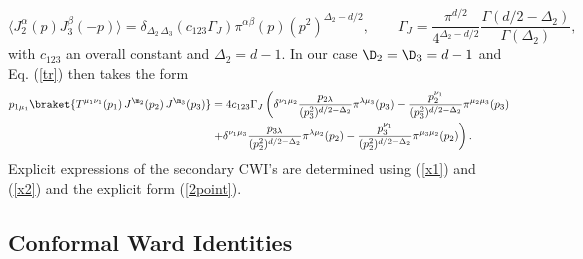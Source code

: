 \documentclass[a4paper,11pt,openright,twoside]{book}
\numberwithin{equation}{section}
\begin{document}
{{{\begin{equation}
	\langle J_2^\alpha(p)J_3^\beta(-p) \rangle =\delta_{\Delta_2\, \Delta_3}\left(c_{123} \Gamma_J \right)\pi^{\alpha\beta}(p) (p^2)^{\Delta_2-d/2},
	\qquad \Gamma_J=\frac{\pi^{d/2}}{ 4^{\Delta_2 -d/2}}\frac{\Gamma(d/2-\Delta_2)}{\Gamma(\Delta_2)},\label{twoJJ}
\end{equation}
with $c_{123}$ an overall constant and $\Delta_2=d-1$. In our case $\D_2=\D_3=d-1$ and Eq. (\ref{tr}) then takes the form 
\begin{align}
	\label{2point}
	p_{1\mu_1}\braket{T^{\mu_1\nu_1}(p_1)\,J^{\m_2}(p_2)\,J^{\m_3}(p_3)}&=4 c_{123} \Gamma_J
	\left( \delta^{\nu_1\mu_2}\frac{p_{2\lambda}}{(p_3^2)^{d/2 -\Delta_2}} {\pi^{\lambda \mu_3}}(p_3) -
	\frac{p_2^{\nu_1}}{(p_3^2)^{d/2 -\Delta_2}}\pi^{\mu_2\mu_3}(p_3) \right.\notag\\
	& \left. + \delta^{\nu_1\mu_3}\frac{p_{3\lambda}}{(p_2^2)^{d/2-\Delta_2}}\pi^{\lambda \mu_2}(p_2) -\frac{p_3^{\nu_1}}{(p_2^2)^{d/2-\Delta_2}}\pi^{\mu_3\mu_2}(p_2)\right).
\end{align}
Explicit expressions of the secondary CWI's are determined using (\ref{x1}) and (\ref{x2}) and the explicit form (\ref{2point}).


\subsection{Conformal Ward Identities}\label{Skend}

}}}
\end{document}
